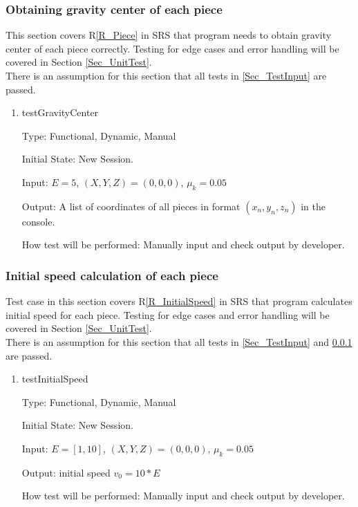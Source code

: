 \documentclass[12pt, titlepage]{article}
\newcommand{\rref}[1]{R\ref{#1}}
\begin{document}
\subsubsection{Obtaining gravity center of each piece}
\label{Sec_testGravityCenter}

This section covers \rref{R_Piece} in SRS that program needs to obtain gravity center of each piece correctly. Testing for edge cases and error handling will be covered in Section \ref{Sec_UnitTest}. \\
There is an assumption for this section that all tests in \ref{Sec_TestInput} are passed.

\begin{enumerate}

\item{testGravityCenter\\}

Type: Functional, Dynamic, Manual

Initial State: New Session.

Input: $E = 5$, $(X,Y,Z) = (0,0,0)$, $\mu_{k} = 0.05$  

Output: A list of coordinates of all pieces in format $(x_{n},y_{n},z_{n})$ in the console.

How test will be performed: Manually input and check output by developer.

\end{enumerate}

\subsubsection{Initial speed calculation of each piece}
\label{Sec_TestForInitialSpeed}

Test case in this section covers \rref{R_InitialSpeed} in SRS that program calculates initial speed for each piece. Testing for edge cases and error handling will be covered in Section \ref{Sec_UnitTest}.\\
There is an assumption for this section that all tests in \ref{Sec_TestInput} and \ref{Sec_testGravityCenter} are passed.
\begin{enumerate}

\item{testInitialSpeed\\}

Type: Functional, Dynamic, Manual

Initial State: New Session.

Input: $E = [1,10]$, $(X,Y,Z) = (0,0,0)$, $\mu_{k} = 0.05$  

Output: initial speed $v_{0} = 10 * E$

How test will be performed: Manually input and check output by developer.

\end{enumerate}
\end{document}

